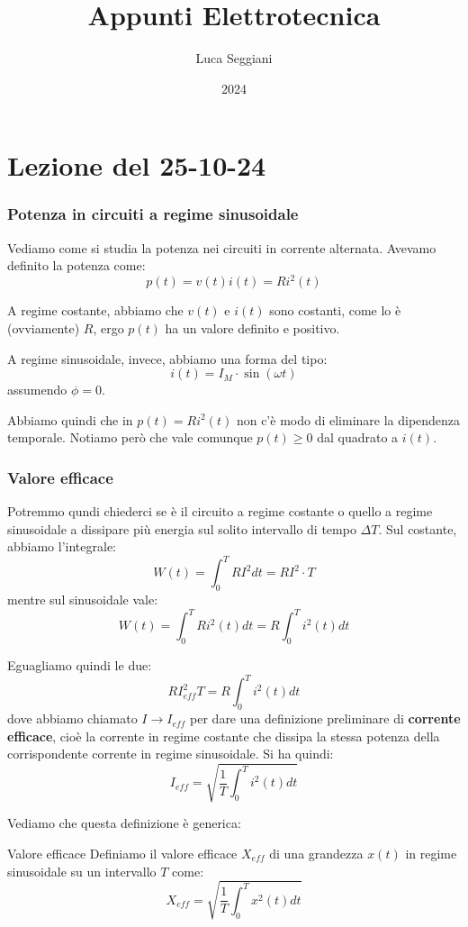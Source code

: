 \documentclass[a4paper,11pt]{article}
\title{Appunti Elettrotecnica}
\author{Luca Seggiani}
\date{2024}
\begin{document}
\section{Lezione del 25-10-24}

\thispagestyle{empty}
\pagestyle{fancy}

\subsubsection{Potenza in circuiti a regime sinusoidale}
Vediamo come si studia la potenza nei circuiti in corrente alternata.
Avevamo definito la potenza come:
$$ p(t) = v(t)i(t) = R i^2(t) $$

A regime costante, abbiamo che $v(t)$ e $i(t)$ sono costanti, come lo è (ovviamente) $R$, ergo $p(t)$ ha un valore definito e positivo.

A regime sinusoidale, invece, abbiamo una forma del tipo:
$$
i(t) = I_M \cdot \sin(\omega t)
$$
assumendo $\phi = 0$.

Abbiamo quindi che in $p(t) = R i^2(t)$ non c'è modo di eliminare la dipendenza temporale.
Notiamo però che vale comunque $p(t) \geq 0$ dal quadrato a $i(t)$.

\subsubsection{Valore efficace}
Potremmo qundi chiederci se è il circuito a regime costante o quello a regime sinusoidale a dissipare più energia sul solito intervallo di tempo $\Delta T$.
Sul costante, abbiamo l'integrale:
$$
W(t) = \int_0^T RI^2 dt = RI^2 \cdot T 
$$
mentre sul sinusoidale vale:
$$
W(t) = \int_0^T Ri^2(t) dt = R \int_0^T i^2(t)dt
$$

Eguagliamo quindi le due:
$$
RI_{eff}^2 T = R \int_0^T i^2(t)dt
$$
dove abbiamo chiamato $I \rightarrow I_{eff}$ per dare una definizione preliminare di \textbf{corrente efficace}, cioè la corrente in regime costante che dissipa la stessa potenza della corrispondente corrente in regime sinusoidale.
Si ha quindi:
$$
I_{eff} = \sqrt{\frac{1}{T}\int_0^T i^2(t)dt}
$$

Vediamo che questa definizione è generica:
\begin{definition}{Valore efficace}
	Definiamo il valore efficace $X_{eff}$ di una grandezza $x(t)$ in regime sinusoidale su un intervallo $T$ come:
$$
X_{eff} = \sqrt{\frac{1}{T}\int_0^T x^2(t)dt}
$$
\end{definition}
\end{document}
